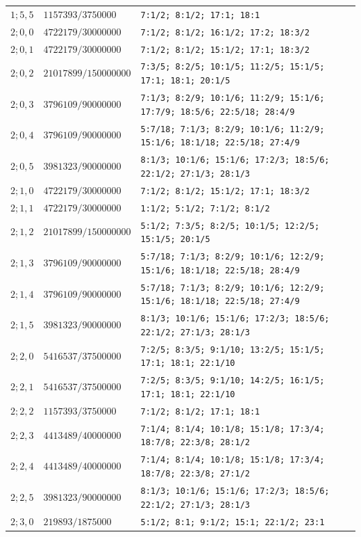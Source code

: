 \begin{longtable}{@{}p{}p{}p{}@{}}
$1;5,5$ & $1157393/3750000$ & \texttt{7:1/2; 8:1/2; 17:1; 18:1} \\
$2;0,0$ & $4722179/30000000$ & \texttt{7:1/2; 8:1/2; 16:1/2; 17:2; 18:3/2} \\
$2;0,1$ & $4722179/30000000$ & \texttt{7:1/2; 8:1/2; 15:1/2; 17:1; 18:3/2} \\
$2;0,2$ & $21017899/150000000$ & \texttt{7:3/5; 8:2/5; 10:1/5; 11:2/5; 15:1/5; 17:1; 18:1; 20:1/5} \\
$2;0,3$ & $3796109/90000000$ & \texttt{7:1/3; 8:2/9; 10:1/6; 11:2/9; 15:1/6; 17:7/9; 18:5/6; 22:5/18; 28:4/9} \\
$2;0,4$ & $3796109/90000000$ & \texttt{5:7/18; 7:1/3; 8:2/9; 10:1/6; 11:2/9; 15:1/6; 18:1/18; 22:5/18; 27:4/9} \\
$2;0,5$ & $3981323/90000000$ & \texttt{8:1/3; 10:1/6; 15:1/6; 17:2/3; 18:5/6; 22:1/2; 27:1/3; 28:1/3} \\
$2;1,0$ & $4722179/30000000$ & \texttt{7:1/2; 8:1/2; 15:1/2; 17:1; 18:3/2} \\
$2;1,1$ & $4722179/30000000$ & \texttt{1:1/2; 5:1/2; 7:1/2; 8:1/2} \\
$2;1,2$ & $21017899/150000000$ & \texttt{5:1/2; 7:3/5; 8:2/5; 10:1/5; 12:2/5; 15:1/5; 20:1/5} \\
$2;1,3$ & $3796109/90000000$ & \texttt{5:7/18; 7:1/3; 8:2/9; 10:1/6; 12:2/9; 15:1/6; 18:1/18; 22:5/18; 28:4/9} \\
$2;1,4$ & $3796109/90000000$ & \texttt{5:7/18; 7:1/3; 8:2/9; 10:1/6; 12:2/9; 15:1/6; 18:1/18; 22:5/18; 27:4/9} \\
$2;1,5$ & $3981323/90000000$ & \texttt{8:1/3; 10:1/6; 15:1/6; 17:2/3; 18:5/6; 22:1/2; 27:1/3; 28:1/3} \\
$2;2,0$ & $5416537/37500000$ & \texttt{7:2/5; 8:3/5; 9:1/10; 13:2/5; 15:1/5; 17:1; 18:1; 22:1/10} \\
$2;2,1$ & $5416537/37500000$ & \texttt{7:2/5; 8:3/5; 9:1/10; 14:2/5; 16:1/5; 17:1; 18:1; 22:1/10} \\
$2;2,2$ & $1157393/3750000$ & \texttt{7:1/2; 8:1/2; 17:1; 18:1} \\
$2;2,3$ & $4413489/40000000$ & \texttt{7:1/4; 8:1/4; 10:1/8; 15:1/8; 17:3/4; 18:7/8; 22:3/8; 28:1/2} \\
$2;2,4$ & $4413489/40000000$ & \texttt{7:1/4; 8:1/4; 10:1/8; 15:1/8; 17:3/4; 18:7/8; 22:3/8; 27:1/2} \\
$2;2,5$ & $3981323/90000000$ & \texttt{8:1/3; 10:1/6; 15:1/6; 17:2/3; 18:5/6; 22:1/2; 27:1/3; 28:1/3} \\
$2;3,0$ & $219893/1875000$ & \texttt{5:1/2; 8:1; 9:1/2; 15:1; 22:1/2; 23:1} \\

\end{longtable}
